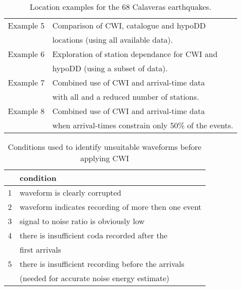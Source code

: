 \documentclass[12pt,double]{article}
\begin{document}
\begin{table}
\caption{Location examples for the 68 Calaveras earthquakes.}
\label{tab:examples}
\begin{tabular}{ll}
\hline
Example 5 & Comparison of CWI, catalogue and hypoDD \\
 & locations (using all available data). \\
Example 6 & Exploration of station dependance for CWI and \\
 & hypoDD (using a subset of data). \\
Example 7 & Combined use of CWI and arrival-time data \\
& with all and a reduced number of stations. \\
Example 8 & Combined use of CWI and arrival-time data \\
 & when arrival-times constrain only 50\% of the events. \\
 \hline
\end{tabular}
\end{table}


\begin{table}
\caption[Conditions for identifying unsuitable waveforms when
applying CWI] {Conditions used to identify unsuitable waveforms
before applying CWI \citep[Originally published as Table
5][]{dr_Robinson11a}} \label{tab:-conditions4unsuitablewaveform}
\begin{tabular}{|l|p{}|}
\hline
 & \textbf{condition} \\
\hline
1 & waveform is clearly corrupted \\
2 & waveform indicates recording of more then one event \\
3 & signal to noise ratio is obviously low \\
4 & there is insufficient coda recorded after the \\
 & first arrivals \\
5 & there is insufficient recording before the arrivals \\
 &  (needed for accurate noise energy estimate) \\
\hline
\end{tabular}
\end{table}


\clearpage

\end{document}
